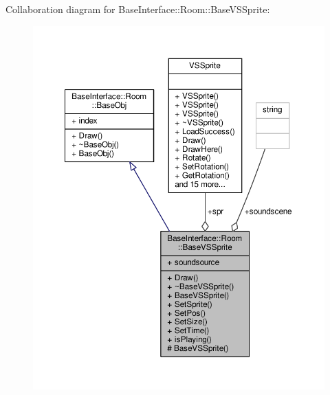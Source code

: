 Collaboration diagram for Base\+Interface\+:\+:Room\+:\+:Base\+V\+S\+Sprite\+:
\nopagebreak
\begin{figure}[H]
\begin{center}
\leavevmode
\includegraphics[width=350pt]{d5/dcf/classBaseInterface_1_1Room_1_1BaseVSSprite__coll__graph}
\end{center}
\end{figure}
